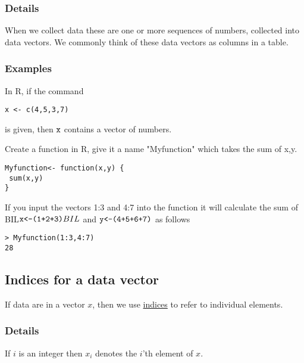 \documentclass[12pt,a4paper]{article}
\theoremstyle{regla}
\theoremstyle{remark}
\theoremstyle{definition}
\theoremstyle{nonumberbreak}
\begin{document}
\subsubsection{Details}
When we collect data these are one or more sequences of numbers, collected into data vectors. We commonly think of these data vectors as columns in a table.

\subsubsection{Examples}
\begin{xmpl}
In R, if the command

\begin{lstlisting}
x <- c(4,5,3,7)
\end{lstlisting}

is given, then $\verb1x1$ contains  a vector of numbers.
\end{xmpl}
\begin{xmpl}
Create a function in R, give it a name "Myfunction" which takes the sum of x,y.

\begin{lstlisting}
Myfunction<- function(x,y) {
 sum(x,y)
}
\end{lstlisting}

If you input the vectors 1:3 and 4:7 into the function it will calculate the sum of BIL$\verb|x<-(1+2+3)|BIL$ and $\verb|y<-(4+5+6+7)|$ as follows
\begin{lstlisting}
> Myfunction(1:3,4:7)
28
\end{lstlisting}
\end{xmpl}

\subsection{Indices for a data vector}
\begin{fbox}
\begin{minipage}{0.97\textwidth}
If data are in a vector $x$, then we use \underline{indices} to refer to individual elements.
\end{minipage}
\end{fbox}
\subsubsection{Details}
If $i$ is an integer then $x_i$ denotes the $i$'th element of $x$. \\
\end{document}

